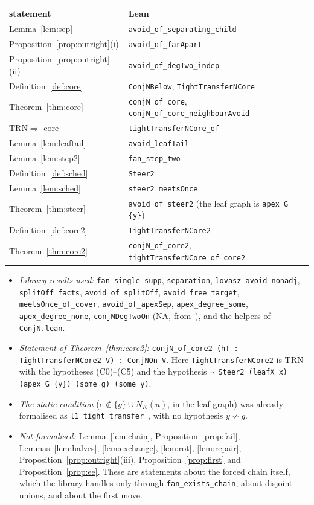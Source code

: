 \documentclass[11pt]{amsart}
\theoremstyle{definition}
\newcommand{\TRN}{\mathrm{TRN}}
\begin{document}
\begin{center}\small
\begin{tabular}{ll}
\toprule
statement & Lean\\
\midrule
Lemma~\ref{lem:sep} & \texttt{avoid\_of\_separating\_child}\\
Proposition~\ref{prop:outright}(i) & \texttt{avoid\_of\_farApart}\\
Proposition~\ref{prop:outright}(ii) & \texttt{avoid\_of\_degTwo\_indep}\\
Definition~\ref{def:core} & \texttt{ConjNBelow}, \texttt{TightTransferNCore}\\
Theorem~\ref{thm:core} & \texttt{conjN\_of\_core}, \texttt{conjN\_of\_core\_neighbourAvoid}\\
$\TRN\Rightarrow$ core & \texttt{tightTransferNCore\_of}\\
Lemma~\ref{lem:leaftail} & \texttt{avoid\_leafTail}\\
Lemma~\ref{lem:step2} & \texttt{fan\_step\_two}\\
Definition~\ref{def:sched} & \texttt{Steer2}\\
Lemma~\ref{lem:sched} & \texttt{steer2\_meetsOnce}\\
Theorem~\ref{thm:steer} & \texttt{avoid\_of\_steer2} (the leaf graph is \texttt{apex G \{y\}})\\
Definition~\ref{def:core2} & \texttt{TightTransferNCore2}\\
Theorem~\ref{thm:core2} & \texttt{conjN\_of\_core2}, \texttt{tightTransferNCore\_of\_core2}\\
\bottomrule
\end{tabular}
\end{center}

\begin{itemize}
\item \emph{Library results used:} \texttt{fan\_single\_supp}, \texttt{separation},
\texttt{lovasz\_avoid\_nonadj}, \texttt{splitOff\_facts}, \texttt{avoid\_of\_splitOff},
\texttt{avoid\_free\_target}, \texttt{meetsOnce\_of\_cover}, \texttt{avoid\_of\_apexSep},
\texttt{apex\_degree\_some}, \texttt{apex\_degree\_none},
\texttt{conjNDegTwoOn} (NA, from~\cite{NA}), and the helpers of \texttt{ConjN.lean}.
\item \emph{Statement of Theorem~\ref{thm:core2}:} \texttt{conjN\_of\_core2 (hT :
TightTransferNCore2 V) : ConjNOn V}. Here \texttt{TightTransferNCore2} is $\TRN$ with the hypotheses
(C0)--(C5) and the hypothesis \texttt{¬ Steer2 (leafX x) (apex G \{y\}) (some g) (some y)}.
\item \emph{The static condition} ($e\notin\{g\}\cup N_K(u)$, in the leaf graph) was already
formalised as \texttt{l1\_tight\_transfer}~\cite{TF}, with no hypothesis $y\not\sim g$.
\item \emph{Not formalised:} Lemma~\ref{lem:chain}, Proposition~\ref{prop:fail},
Lemmas~\ref{lem:halves}, \ref{lem:exchange}, \ref{lem:rot}, \ref{lem:repair},
Proposition~\ref{prop:outright}(iii), Proposition~\ref{prop:first} and Proposition~\ref{prop:ee}.
These are statements about the forced chain itself, which the library handles only through
\texttt{fan\_exists\_chain}, about disjoint unions, and about the first move.
\end{itemize}
\end{document}

